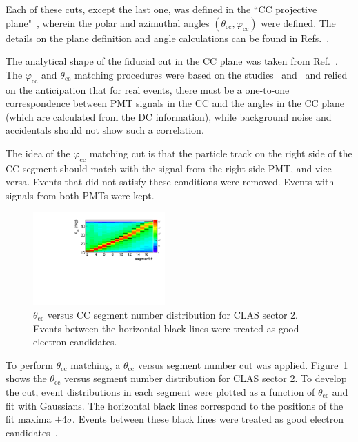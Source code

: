 \documentclass[prc,twocolumn,superscriptaddress,showpacs,amssymb,amsmath,amsfonts,aps,nofootinbib]{revtex4-1}
\begin{document}
Each of these cuts, except the last one, was defined in the ``CC projective plane"~\cite{Osipenko:2004}, wherein the polar and azimuthal angles $(\theta_{\text{cc}},\varphi_{\text{cc}})$ were defined. The details on the plane definition and angle calculations can be found in Refs.\!~\cite{my_an_note:2020,Osipenko:2004}.


The analytical shape of the fiducial cut in the CC plane was taken from Ref.\!~\cite{Khetarpal:2010}. The $\varphi_{\text{cc}}$ and $\theta_{\text{cc}}$ matching procedures were based on the studies~\cite{Osipenko:2004} and~\cite{Ungaro:2010} and relied on the anticipation that for real events, there must be a one-to-one correspondence between PMT signals in the CC and the angles in the CC plane (which are calculated from the DC information), while background noise and accidentals should not show such a correlation.


The idea of the $\varphi_{\text{cc}}$ matching cut is that the particle track on the right side of the CC segment should match with the signal from the right-side PMT, and vice versa. Events that did not satisfy these conditions were removed. Events with signals from both PMTs were kept.


\begin{figure}[htp]
\begin{center}
 \includegraphics[width=0.45\textwidth,keepaspectratio]{pictures/event_selection/th_vs_seg.pdf}
\caption{$\theta_{\text{cc}}$ versus CC segment number distribution for CLAS sector 2. Events between the horizontal black lines were treated as good electron candidates.}
\label{fig:th_vs_seg}
\end{center}
\end{figure}


To perform $\theta_{\text{cc}}$ matching, a $\theta_{\text{cc}}$ versus segment number cut was applied. Figure~\ref{fig:th_vs_seg} shows the $\theta_{\text{cc}}$ versus segment number distribution for CLAS sector 2. To develop the cut, event distributions in each segment were plotted as a function of $\theta_{\text{cc}}$ and fit with Gaussians. The horizontal black lines correspond to the positions of the fit maxima $\pm4\sigma$. Events between these black lines were treated as good electron candidates~\cite{my_an_note:2020, my_thesis:2021}.
\end{document}
